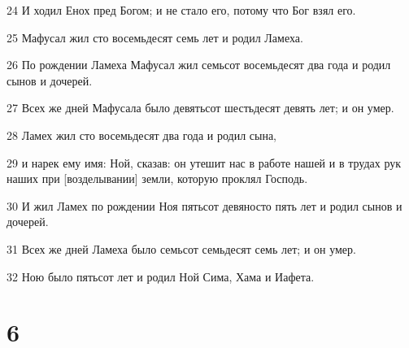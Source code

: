 \par 24 И ходил Енох пред Богом; и не стало его, потому что Бог взял его.
\par 25 Мафусал жил сто восемьдесят семь лет и родил Ламеха.
\par 26 По рождении Ламеха Мафусал жил семьсот восемьдесят два года и родил сынов и дочерей.
\par 27 Всех же дней Мафусала было девятьсот шестьдесят девять лет; и он умер.
\par 28 Ламех жил сто восемьдесят два года и родил сына,
\par 29 и нарек ему имя: Ной, сказав: он утешит нас в работе нашей и в трудах рук наших при [возделывании] земли, которую проклял Господь.
\par 30 И жил Ламех по рождении Ноя пятьсот девяносто пять лет и родил сынов и дочерей.
\par 31 Всех же дней Ламеха было семьсот семьдесят семь лет; и он умер.
\par 32 Ною было пятьсот лет и родил Ной Сима, Хама и Иафета.

\chapter{6}

